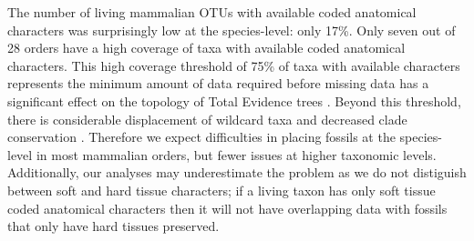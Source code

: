 \documentclass[12pt,letterpaper]{article}
\begin{document}
The number of living mammalian OTUs with available coded anatomical characters was surprisingly low at the species-level: only 17\%.
Only seven out of 28 orders have a high coverage of taxa with available coded anatomical characters.
This high coverage threshold of 75\% of taxa with available characters represents the minimum amount of data required before missing data has a significant effect on the topology of Total Evidence trees \cite{GuillermeCooper}.
Beyond this threshold, there is considerable displacement of wildcard taxa and decreased clade conservation \cite{GuillermeCooper}.
Therefore we expect difficulties in placing fossils at the species-level in most mammalian orders, but fewer issues at higher taxonomic levels.
Additionally, our analyses may underestimate the problem as we do not distiguish between soft and hard tissue characters; if a living taxon has only soft tissue coded anatomical characters then it will not have overlapping data with fossils that only have hard tissues preserved. %

%
%
%
\end{document}
